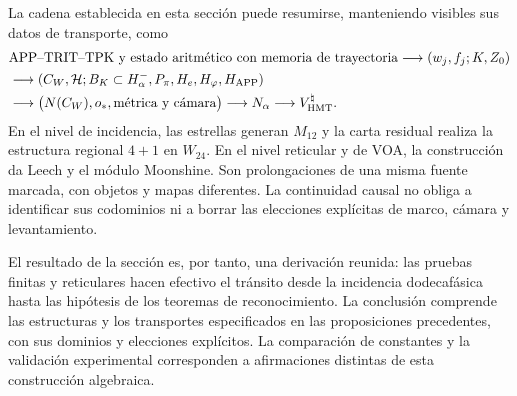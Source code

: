 La cadena establecida en esta sección puede resumirse, manteniendo
visibles sus datos de transporte, como
\begin{align*}
 &\text{APP--TRIT--TPK y estado aritmético con memoria de trayectoria}
   \longrightarrow (w_j,f_j;K,Z_0)\\
 &\longrightarrow (C_W,\mathcal H;B_K\subset H^-_\alpha,
                   P_\pi,H_e,H_\varphi,H_{\rm APP})\\
 &\longrightarrow \bigl(N(C_W),o_*,\text{métrica y cámara}\bigr)
   \longrightarrow N_\alpha
   \longrightarrow V^\natural_{\rm HMT}.
\end{align*}
En el nivel de incidencia, las estrellas generan $M_{12}$ y la
carta residual realiza la estructura regional $4+1$ en $W_{24}$.
En el nivel reticular y de VOA, la construcción da Leech y el módulo
Moonshine. Son prolongaciones de una misma fuente marcada, con
objetos y mapas diferentes. La continuidad causal no obliga a
identificar sus codominios ni a borrar las elecciones explícitas
de marco, cámara y levantamiento.

El resultado de la sección es, por tanto, una derivación reunida:
las pruebas finitas y reticulares hacen efectivo el tránsito desde
la incidencia dodecafásica hasta las hipótesis de los teoremas de
reconocimiento. La conclusión comprende las estructuras y los
transportes especificados en las proposiciones precedentes, con sus
dominios y elecciones explícitos. La comparación de constantes y la
validación experimental corresponden a afirmaciones distintas de esta
construcción algebraica.
